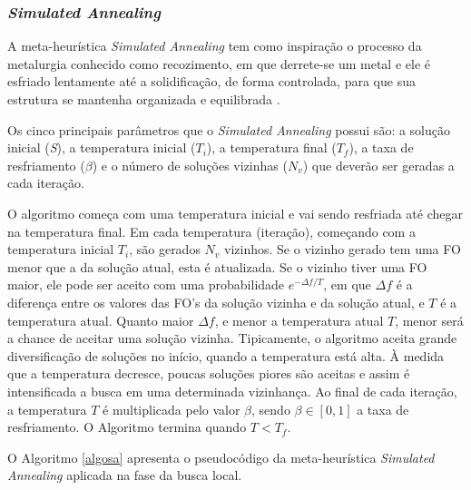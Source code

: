 \subsubsection{\textit{Simulated Annealing}}
\label{sec-met-sa}

A meta-heurística \textit{Simulated Annealing} tem como inspiração o processo da metalurgia conhecido como recozimento, em que derrete-se um metal e ele é esfriado lentamente até a solidificação, de forma controlada, para que sua estrutura se mantenha organizada e equilibrada \cite{kirkpatrick1983optimization}.

Os cinco principais parâmetros que o \textit{Simulated Annealing} possui são: a solução inicial (\emph{S}), a temperatura inicial (\(T_i\)), a temperatura final (\(T_f\)), a taxa de resfriamento (\(\beta\)) e o número de soluções vizinhas (\(N_v\)) que deverão ser geradas a cada iteração.

O algoritmo começa com uma temperatura inicial e vai sendo resfriada até chegar na temperatura final. Em cada temperatura (iteração), começando com a temperatura inicial \(T_i\), são gerados \(N_v\) vizinhos. Se o vizinho gerado tem uma FO menor que a da solução atual, esta é atualizada. Se o vizinho tiver uma FO maior, ele pode ser aceito com uma probabilidade \(e^{-\Delta f/T}\), em que \(\Delta f\) é a diferença entre os valores das FO's da solução vizinha e da solução atual, e \(T\) é a temperatura atual. Quanto maior \(\Delta f\), e menor a temperatura atual \(T\), menor será a chance de aceitar uma solução vizinha. Tipicamente, o algoritmo aceita grande diversificação de soluções no início, quando a temperatura está alta. À medida que a temperatura decresce, poucas soluções piores são aceitas e assim é intensificada a busca em uma determinada vizinhança. Ao final de cada iteração, a temperatura \(T\) é multiplicada pelo valor \(\beta\), sendo \(\beta \in [0,1]\) a taxa de resfriamento. O Algoritmo termina quando \(T < T_f\).

O Algoritmo \ref{algosa} apresenta o pseudocódigo da meta-heurística \textit{Simulated Annealing} aplicada na fase da busca local.

